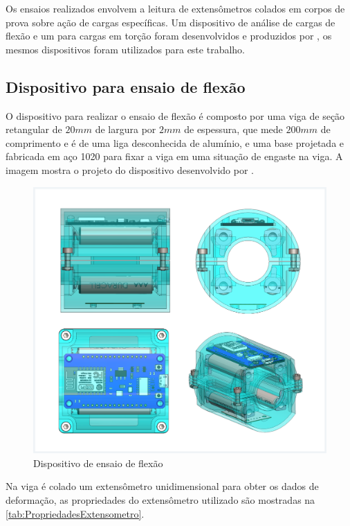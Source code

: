 Os ensaios realizados envolvem a leitura de extensômetros colados em corpos de prova sobre ação de cargas específicas. Um dispositivo de análise de cargas de flexão e
um para cargas em torção foram desenvolvidos e produzidos por \autocite{Minela2017}, os mesmos dispositivos foram utilizados para este trabalho.

\subsection{Dispositivo para ensaio de flexão}

O dispositivo para realizar o ensaio de flexão é composto por uma viga de seção retangular de $20mm$ de largura por $2mm$ de espessura, que mede $200mm$
de comprimento e é de uma liga desconhecida de alumínio, e uma base projetada e fabricada em aço 1020 para fixar a viga em uma situação de engaste na viga.
A imagem mostra o projeto do dispositivo desenvolvido por \autocite{Minela2017}.

\begin{figure}[htb]
	\caption{\label{fig:2040} Dispositivo de ensaio de flexão}
	\begin{center}
		\includegraphics[width=\textwidth]{pictures/2040.png}
	\end{center}
\end{figure}

Na viga é colado um extensômetro unidimensional para obter os dados de deformação, as propriedades do extensômetro utilizado são mostradas na
\autoref{tab:PropriedadesExtensometro}.

